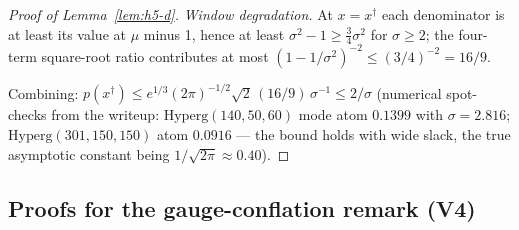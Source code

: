 \begin{proof}[Proof of Lemma~\ref{lem:h5-d}]
\emph{Window degradation.} At $x = x^{\dagger}$ each denominator is at least
its value at $\mu$ minus 1, hence at least $\sigma^2 - 1 \ge
\tfrac{3}{4}\sigma^2$ for $\sigma \ge 2$; the four-term square-root ratio
contributes at most $(1 - 1/\sigma^2)^{-2} \le (3/4)^{-2} = 16/9$.

Combining:
$p(x^{\dagger}) \le e^{1/3}(2\pi)^{-1/2}\sqrt{2}\,(16/9)\,\sigma^{-1} \le
2/\sigma$
(numerical spot-checks from the writeup:
$\mathrm{Hyperg}(140,50,60)$ mode atom $0.1399$ with $\sigma = 2.816$;
$\mathrm{Hyperg}(301,150,150)$ atom $0.0916$ --- the bound holds with wide
slack, the true asymptotic constant being $1/\sqrt{2\pi} \approx 0.40$).
\end{proof}

\subsection{Proofs for the gauge-conflation remark (V4)}
\label{app:proofs-v4}

